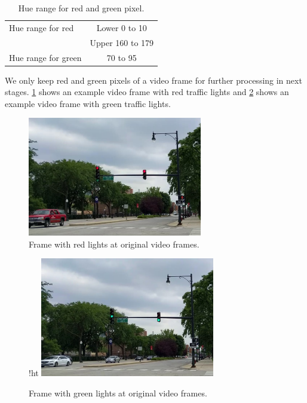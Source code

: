 \begin{table}[h!]
  \centering

  \begin{tabular}{  l  c  }
    \rowcolor{gray!50}
    \hline
    Hue range for red & Lower 0 to 10 \\ \cline{2-2}
    & Upper 160 to 179 \\
    \hline \hline
    Hue range for green & 70 to 95 \\
    \hline
  \end{tabular}
  \caption{Hue range for red and green pixel.}
  \label{t:hue_range}
\end{table}


We only keep red and green pixels of a video frame for further processing in next stages.
\ref{f:red} shows an example video frame with red traffic lights and \ref{f:green} shows an example video frame with green traffic lights.

\begin{figure}[!ht]
  \centering
  \includegraphics[width=3in]{images/frame301.pdf}
  \caption{Frame with red lights at original video frames.}
  \label{f:red}
\end{figure}

\begin{figure}[]!ht
  \centering
  \includegraphics[width=3in]{images/frame502.pdf}
  \caption{Frame with green lights at original video frames.}
  \label{f:green}
\end{figure}

